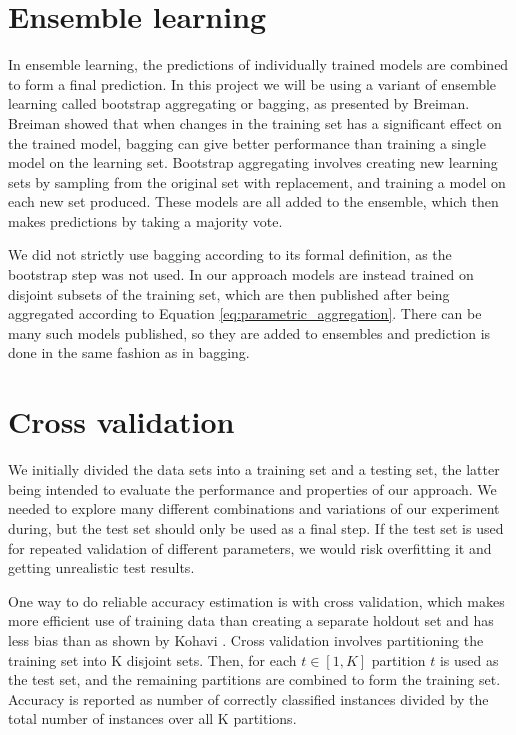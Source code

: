 \section{Ensemble learning}

In ensemble learning, the predictions of individually trained models are combined to form a final prediction\cite{opitz1999popularensemble}. In this project we will be using a variant of ensemble learning called bootstrap aggregating or bagging, as presented by Breiman\cite{breiman1996bagging}. Breiman showed that when changes in the training set has a significant effect on the trained model, bagging can give better performance than training a single model on the learning set. Bootstrap aggregating involves creating new learning sets by sampling from the original set with replacement, and training a model on each new set produced. These models are all added to the ensemble, which then makes predictions by taking a majority vote.

We did not strictly use bagging according to its formal definition, as the bootstrap step was not used. In our approach models are instead trained on disjoint subsets of the training set, which are then published after being aggregated according to Equation \ref{eq:parametric_aggregation}. There can be many such models published, so they are added to ensembles and prediction is done in the same fashion as in bagging. 

\section{Cross validation}

We initially divided the data sets into a training set and a testing set, the latter being intended to evaluate the performance and properties of our approach. We needed to explore many different combinations and variations of our experiment during, but the test set should only be used as a final step. If the test set is used for repeated validation of different parameters, we would risk overfitting it and getting unrealistic test results. 

One way to do reliable accuracy estimation is with cross validation, which makes more efficient use of training data than creating a separate holdout set and has less bias than as shown by Kohavi \cite{kohavi1995crossvalidation}. Cross validation involves partitioning the training set into K disjoint sets. Then, for each $t \in [1, K]$ partition $t$ is used as the test set, and the remaining partitions are combined to form the training set. Accuracy is reported as number of correctly classified instances divided by the total number of instances over all K partitions. 

